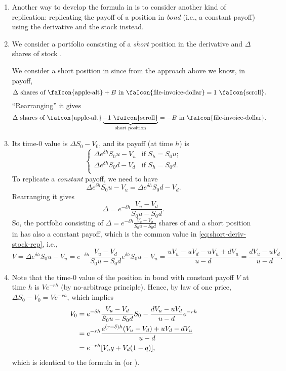 \begin{enumerate}
\item Another way to develop the formula in  is
to consider another kind of replication: replicating the payoff of a position
in \emph{bond}  (i.e., a constant payoff) using the
derivative  and the stock  instead.

\item We consider a portfolio consisting of a \emph{short} position in the
derivative  and \(\Delta\) shares of stock .
\begin{intuition}
We consider a short position in  since from the approach above
we know, in payoff,
\[
\text{\(\Delta\) shares of \faIcon{apple-alt}} + \text{\(B\) in
\faIcon{file-invoice-dollar}} = \text{1 \faIcon{scroll}}.
\]
``Rearranging'' it gives
\[
\text{\(\Delta\) shares of \faIcon{apple-alt}} \underbrace{- \text{1 \faIcon{scroll}}}_{\text{short position}}
= -\text{\(B\) in \faIcon{file-invoice-dollar}}.
\]
\end{intuition}

\item Its time-0 value is \(\Delta S_0-V_0\), and its payoff (at time \(h\)) is
\[
\begin{cases}
\Delta e^{\delta h}S_0u-V_u&\text{if }S_h=S_0u;\\
\Delta e^{\delta h}S_0d-V_d&\text{if }S_h=S_0d.\\
\end{cases}
\]
To replicate a \emph{constant} payoff, we need to have
\begin{equation}
\label{eq:short-deriv-stock-rep}
\Delta e^{\delta h}S_0u-V_u=\Delta e^{\delta h}S_0d-V_d.
\end{equation}
Rearranging it gives
\[
\Delta=e^{-\delta h}\frac{V_u-V_d}{S_0u-S_0d}.
\]
So, the portfolio consisting of \(\displaystyle \Delta=e^{-\delta
h}\frac{V_u-V_d}{S_0u-S_0d}\) shares of  and a short position
in  has also a constant payoff, which is the common value
in \cref{eq:short-deriv-stock-rep}, i.e.,
\[
V=\Delta e^{\delta h}S_0u-V_u
=e^{-\delta h}\frac{V_u-V_d}{S_0u-S_0d}e^{\delta h}S_0u-V_u
=\frac{uV_u-uV_d-uV_u+dV_u}{u-d}
=\frac{dV_u-uV_d}{u-d}.
\]

\item Note that the time-0 value of the position in bond with constant payoff
\(V\) at time \(h\) is \(Ve^{-rh}\) (by no-arbitrage principle). Hence, by law
of one price, \(\Delta S_0-V_0=Ve^{-rh}\), which implies
\begin{align*}
V_0&=e^{-\delta h}\frac{V_u-V_d}{S_0u-S_0d}S_0-\frac{dV_u-uV_d}{u-d}e^{-rh} \\
&=e^{-rh}\frac{e^{(r-\delta)h}(V_u-V_d)+uV_d-dV_u}{u-d} \\
&=e^{-rh}\qty[V_uq+V_d(1-q)],
\end{align*}
which is identical to the formula in  (or
).
\end{enumerate}

